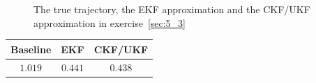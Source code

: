 \documentclass[a4paper,oneside,article]{memoir}
\newcommand{\otoprule}{\midrule[\heavyrulewidth]}
\begin{document}
\begin{figure}[htb]
  \begin{adjustwidth}{-2in}{-2in}
	  \centering
  \end{adjustwidth}
  	  \caption{The true trajectory, the EKF approximation and the CKF/UKF approximation in exercise~\ref{sec:5_3}}
	  \label{fig:ex_5_3}
\end{figure}


\begin{table}[h]
	\centering
	\begin{tabular}{c c c}
		\otoprule
		Baseline & EKF & CKF/UKF\\
		\midrule
		$1.019$ & $0.441$ & $0.438$\\
		\bottomrule
	\end{tabular}
	\label{table:rmse5_3}
\end{table}
\end{document}
